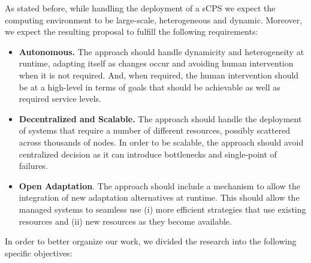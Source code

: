 \bigskip
 \setlength{\fboxsep}{12pt}
 \noindent{}\bigskip


As stated before, while handling the deployment of a sCPS we expect the computing environment to be large-scale, heterogeneous and dynamic. Moreover, we expect the resulting proposal to fulfill the following requirements:

\begin{itemize}

%
%

  \item\textbf{Autonomous.} The approach should handle dynamicity and heterogeneity at runtime, adapting itself as changes occur and avoiding human intervention when it is not required. And, when required, the human intervention should be at a high-level in terms of goals that should be achievable as well as required service levels. 

  \item\textbf{Decentralized and Scalable.} The approach should handle the deployment of systems that require a number of different resources, possibly scattered across thousands of nodes. In order to be scalable, the approach should avoid centralized decision as it can introduce bottlenecks and single-point of failures. 

  \item\textbf{Open Adaptation}. The approach should include a mechanism to allow the integration of new adaptation alternatives at runtime. This should allow the managed systems to seamless use (i) more efficient strategies that use existing resources and (ii) new resources as they become available. 


\end{itemize}

 
In order to better organize our work, we divided the research into the following specific objectives:

